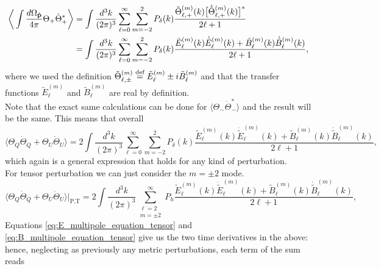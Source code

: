 \begin{align*}
    \bigg\langle\int\frac{d\Omega_{\mathbf{\hat{p}}}}{4\pi}\Theta_+\dot \Theta_+^*\bigg\rangle&=\int\frac{d^3k}{(2\pi)^3}\sum_{\ell=0}^{\infty}\sum_{m=-2}^{2}{P}_\delta (k)\frac{\tilde\Theta_{\ell,+}^{(m)}(k)\big[\dot{\tilde\Theta}_{\ell,+}^{(m)}(k)\big]^*}{2\ell+1}\\&=\int\frac{d^3k}{(2\pi)^3}\sum_{\ell=0}^{\infty}\sum_{m=-2}^{2}{P}_\delta (k)\frac{\tilde E_{\ell}^{(m)}(k)\dot{\tilde E}_{\ell}^{(m)}(k)+\tilde B_{\ell}^{(m)}(k)\dot{\tilde B}_{\ell}^{(m)}(k)}{2\ell+1},
\end{align*}
where we used the definition $\tilde \Theta_{\ell,\pm}^{(m)}\stackrel{\text{def}}{=}\tilde E_{\ell}^{(m)}\pm i\tilde B_\ell^{(m)}$ and that the transfer functions $\tilde E_\ell^{(m)}$ and $\tilde B_\ell^{(m)}$ are real by definition. \\
Note that the exact same calculations can be done for $\langle\Theta_-\dot \Theta_-^*\rangle$ and the result will be the same. This means that overall
\begin{equation}
    \langle\Theta_Q\dot\Theta_Q+\Theta_U\dot\Theta_U\rangle=2\int\frac{d^3k}{(2\pi)^3}\sum_{\ell=0}^{\infty}\sum_{m=-2}^{2}{P}_\delta (k)\frac{\tilde E_{\ell}^{(m)}(k)\dot{\tilde E}_{\ell}^{(m)}(k)+\tilde B_{\ell}^{(m)}(k)\dot{\tilde B}_{\ell}^{(m)}(k)}{2\ell+1},
\end{equation}
which again is a general expression that holds for any kind of perturbation.\\
For tensor perturbation we can just consider the $m=\pm2$ mode.
\begin{equation*}
    \langle\Theta_Q\dot\Theta_Q+\Theta_U\dot\Theta_U\rangle\bigg|_\text{P,T}=2\int\frac{d^3k}{(2\pi)^3}\sum_{\substack{\ell=2\\m=\pm2}}^{\infty}{P}_h\frac{\tilde E_{\ell}^{(m)}(k)\dot{\tilde E}_{\ell}^{(m)}(k)+\tilde B_{\ell}^{(m)}(k)\dot{\tilde B}_{\ell}^{(m)}(k)}{2\ell+1},
\end{equation*}
Equations \eqref{eq:E_multipole_equation_tensor} and \eqref{eq:B_multipole_equation_tensor} give us the two time derivatives in the above: hence, neglecting as previously any metric perturbations, each term of the sum reads
